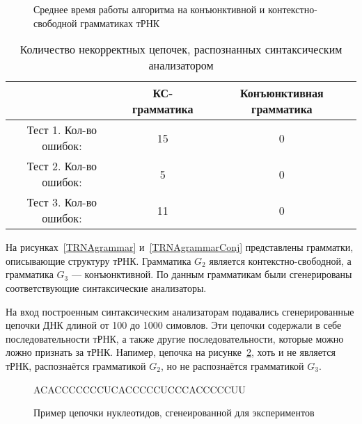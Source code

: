 \begin{figure}
\begin{center}
\end{center}
\caption{Среднее время работы алгоритма на конъюнктивной и контекстно-свободной грамматиках тРНК}
\label{time}
\end{figure}

\begin{table}[h]
\begin{center}
  \begin{tabular}{ | c | c | c |}
    \hline
     & КС-грамматика & Конъюнктивная грамматика \\ \hline
    Тест 1. Кол-во ошибок: & 15 & 0 \\\hline
    Тест 2. Кол-во ошибок: & 5 & 0 \\\hline
    Тест 3. Кол-во ошибок: & 11 & 0 \\
    \hline
  \end{tabular}
\end{center}
\caption{Количество некорректных цепочек, распознанных синтаксическим анализатором}
\label{mistakes}
\end{table}

На рисунках~\ref{TRNAgrammar} и~\ref{TRNAgrammarConj} представлены грамматки, описывающие структуру тРНК. Грамматика $G_2$ является контекстно-свободной, а грамматика $G_3$ --- конъюнктивной. По данным грамматикам были сгенерированы соответствующие синтаксические анализаторы.

На вход построенным синтаксическим анализаторам подавались сгенерированные цепочки ДНК длиной от 100 до 1000 симовлов. Эти цепочки содержали в себе последовательности тРНК, а также другие последовательности, которые можно ложно признать за тРНК. Напимер, цепочка на рисунке~\ref{rnachain}, хоть и не является тРНК, распознаётся грамматикой $G_2$, но не распознаётся грамматикой $G_3$.

\begin{figure}
\begin{center}
ACACCCCCCCUCACCCCCUCCCACCCCCUU
\end{center}
\caption{Пример цепочки нуклеотидов, сгенеированной для экспериментов}
\label{rnachain}
\end{figure}


